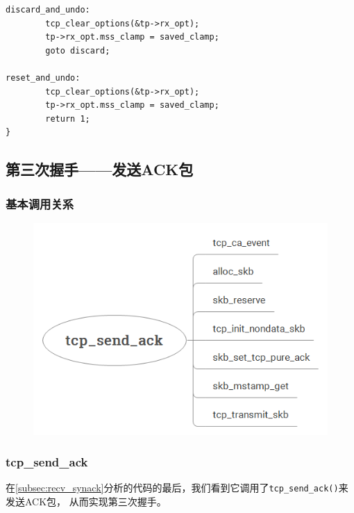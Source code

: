 \begin{verbatim}
discard_and_undo:
        tcp_clear_options(&tp->rx_opt);
        tp->rx_opt.mss_clamp = saved_clamp;
        goto discard;

reset_and_undo:
        tcp_clear_options(&tp->rx_opt);
        tp->rx_opt.mss_clamp = saved_clamp;
        return 1;
}
\end{verbatim}

\subsection{第三次握手——发送ACK包}
\label{subsec:send_ack}
    \subsubsection{基本调用关系}

                \begin{figure}[htb]        
                    \centering
                    \includegraphics[width=\textwidth]  {images/Client:Send ACK.png}
                \end{figure} 
    
    \subsubsection{tcp\_send\_ack}
\label{subsubsec:tcp_send_ack}
在\ref{subsec:recv_synack}分析的代码的最后，我们看到它调用了\texttt{tcp_send_ack()}来发送ACK包，
从而实现第三次握手。

